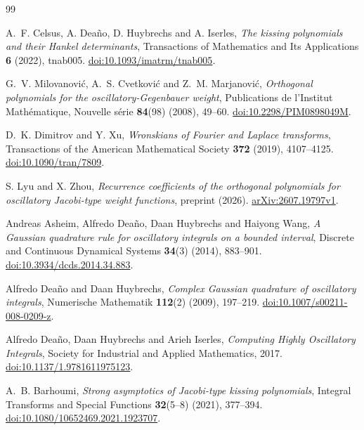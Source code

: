 \documentclass[11pt]{article}
\numberwithin{equation}{section}
\theoremstyle{remark}
\begin{document}
\begin{thebibliography}{99}

A.~F. Celsus, A. Dea\~no, D. Huybrechs and A. Iserles,
\emph{The kissing polynomials and their Hankel determinants},
Transactions of Mathematics and Its Applications \textbf{6} (2022), tnab005.
\href{https://doi.org/10.1093/imatrm/tnab005}{doi:10.1093/imatrm/tnab005}.

G.~V. Milovanovi\'c, A.~S. Cvetkovi\'c and Z.~M. Marjanovi\'c,
\emph{Orthogonal polynomials for the oscillatory-Gegenbauer weight},
Publications de l'Institut Math\'ematique, Nouvelle s\'erie
\textbf{84}(98) (2008), 49--60.
\href{https://doi.org/10.2298/PIM0898049M}{doi:10.2298/PIM0898049M}.

D.~K. Dimitrov and Y. Xu,
\emph{Wronskians of Fourier and Laplace transforms},
Transactions of the American Mathematical Society \textbf{372} (2019),
4107--4125.
\href{https://doi.org/10.1090/tran/7809}{doi:10.1090/tran/7809}.

S. Lyu and X. Zhou,
\emph{Recurrence coefficients of the orthogonal polynomials for
oscillatory Jacobi-type weight functions}, preprint (2026).
\href{https://arxiv.org/abs/2607.19797v1}{arXiv:2607.19797v1}.

Andreas Asheim, Alfredo Deaño, Daan Huybrechs and Haiyong Wang,
\emph{A Gaussian quadrature rule for oscillatory integrals on a bounded interval},
Discrete and Continuous Dynamical Systems \textbf{34}(3) (2014), 883--901.
\href{https://doi.org/10.3934/dcds.2014.34.883}{doi:10.3934/dcds.2014.34.883}.

Alfredo Deaño and Daan Huybrechs,
\emph{Complex Gaussian quadrature of oscillatory integrals},
Numerische Mathematik \textbf{112}(2) (2009), 197--219.
\href{https://doi.org/10.1007/s00211-008-0209-z}{doi:10.1007/s00211-008-0209-z}.

Alfredo Deaño, Daan Huybrechs and Arieh Iserles,
\emph{Computing Highly Oscillatory Integrals},
Society for Industrial and Applied Mathematics, 2017.
\href{https://doi.org/10.1137/1.9781611975123}{doi:10.1137/1.9781611975123}.

A.~B. Barhoumi,
\emph{Strong asymptotics of Jacobi-type kissing polynomials},
Integral Transforms and Special Functions \textbf{32}(5--8) (2021),
377--394.
\href{https://doi.org/10.1080/10652469.2021.1923707}
{doi:10.1080/10652469.2021.1923707}.


\end{thebibliography}
\end{document}

